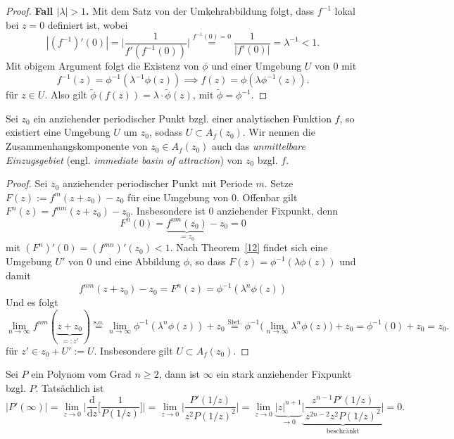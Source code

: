 \documentclass{mywork}
\newcommand{\D}{\mathbb{D}}
\begin{document}
\begin{proof}
\textbf{Fall $|\lambda|>1$.} Mit dem Satz von der Umkehrabbildung folgt, dass $f^{-1}$ lokal bei $z=0$ definiert ist, wobei
\[
|(f^{-1})'(0)|=\Bigg| \frac{1}{f'(f^{-1}(0))}\Bigg|\stackrel{f^{-1}(0)=0}= \frac{1}{|f'(0)|}=\lambda^{-1}<1.
\]
Mit obigem Argument folgt die Existenz von $\phi$ und einer Umgebung $U$ von 0 mit
\[
f^{-1}(z)=\phi^{-1}(\lambda^{-1}\phi(z)) \implies f(z)=\phi(\lambda \phi^{-1}(z)).
\]
für $z\in U$. Also gilt $\tilde \phi (f(z))=\lambda\cdot \tilde \phi(z)$, mit $\tilde \phi=\phi^{-1}$.
\end{proof}

\begin{prop} \label{13}
Sei $z_0$ ein anziehender periodischer Punkt bzgl. einer analytischen Funktion $f$, so existiert eine Umgebung $U$ um $z_0$, sodass $U\subset A_f(z_0)$. Wir nennen die Zusammenhangskomponente von $z_0\in A_f(z_0)$ auch das \emph{unmittelbare Einzugsgebiet} (engl. \emph{immediate basin of attraction}) von $z_0$ bzgl. $f$.
\end{prop}

\begin{proof} 
Sei $z_0$ anziehender periodischer Punkt mit Periode $m$. 
Setze $F(z):=f^m(z+z_0)-z_0$ für eine Umgebung von $0$. Offenbar gilt $F^n(z)=f^{nm}(z+z_0)-z_0$. Insbesondere ist $0$ anziehender Fixpunkt, denn 
\[
F^{n}(0)=\underbrace{f^{nm}(z_0)}_{=z_0}-z_0=0
\] 
mit $(F^{n})'(0)=(f^{mn})'(z_0)<1$. Nach Theorem~\ref{12} findet sich eine Umgebung $U'$ von $0$ und eine Abbildung $\phi$, so dass $F(z)=\phi^{-1}(\lambda\phi(z))$ und damit
\[
	f^{nm}(z+z_0)-z_0=F^n(z)=\phi^{-1}(\lambda^n \phi(z))
\]
Und es folgt
\[
\lim_{n\to \infty} f^{nm}(\underbrace{z+z_0}_{=:z'})\stackrel{\text{s.o.}}= \lim_{n\to \infty} \phi^{-1}(\lambda^n \phi(z))+z_0\stackrel{\text{Stet.}}= \phi^{-1}\Big(\lim_{n\to \infty} \lambda^n \phi(z)\Big)+z_0=\phi^{-1}(0)+z_0=z_0.
\]
für $z'\in z_0+U':=U$. Insbesondere gilt $U\subset A_f(z_0)$.
\end{proof}


\begin{ex}
Sei $P$ ein Polynom vom Grad $n\ge 2$, dann ist $\infty$ ein stark anziehender Fixpunkt bzgl. $P$. Tatsächlich ist 
\[
|P'(\infty)|=\lim_{z\to 0}\Bigg|\frac{\mathrm{d}}{\mathrm{d}z}\Bigg[\frac{1}{P(1/z)}\Bigg]\Bigg|=\lim_{z\to 0}\Bigg|\frac{P'(1/z)}{z^2 P(1/z)^2}\Bigg|=\lim_{z\to 0} \underbrace{|z|^{n+1}}_{\to 0} \underbrace{\Bigg|\frac{z^{n-1} P'(1/z)}{z^{2n-2}z^2 P(1/z)^2}\Bigg|}_{\text{beschränkt}}=0.
\]
\end{ex}
\end{document}
